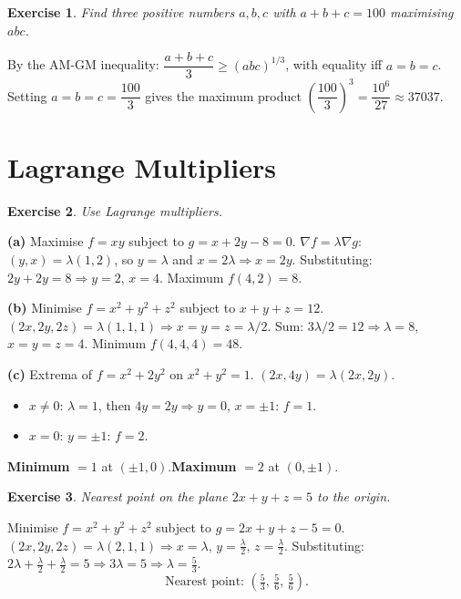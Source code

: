 \documentclass[12pt,a4paper]{article}
\theoremstyle{exstyle}
\newtheorem{exercise}{Exercise}[section]
\newcommand{\grad}{\nabla}
\begin{document}
\begin{exercise}
Find three positive numbers $a,b,c$ with $a+b+c=100$ maximising $abc$.
\end{exercise}
\begin{solbox}
By the AM-GM inequality: $\dfrac{a+b+c}{3}\ge(abc)^{1/3}$, with equality iff $a=b=c$.
Setting $a=b=c=\dfrac{100}{3}$ gives the maximum product
$\left(\dfrac{100}{3}\right)^3=\dfrac{10^6}{27}\approx37037$.
\end{solbox}

\section{Lagrange Multipliers}

\begin{exercise}
Use Lagrange multipliers.
\end{exercise}
\begin{solbox}
\textbf{(a)} Maximise $f=xy$ subject to $g=x+2y-8=0$.
$\grad f=\lambda\grad g$: $(y,x)=\lambda(1,2)$, so $y=\lambda$ and $x=2\lambda\Rightarrow x=2y$.
Substituting: $2y+2y=8\Rightarrow y=2,\,x=4$. Maximum $f(4,2)=8$.

\textbf{(b)} Minimise $f=x^2+y^2+z^2$ subject to $x+y+z=12$.
$(2x,2y,2z)=\lambda(1,1,1)\Rightarrow x=y=z=\lambda/2$. Sum: $3\lambda/2=12\Rightarrow\lambda=8$, $x=y=z=4$.
Minimum $f(4,4,4)=48$.

\textbf{(c)} Extrema of $f=x^2+2y^2$ on $x^2+y^2=1$.
$(2x,4y)=\lambda(2x,2y)$.
\begin{itemize}
  \item $x\neq0$: $\lambda=1$, then $4y=2y\Rightarrow y=0$, $x=\pm1$: $f=1$.
  \item $x=0$: $y=\pm1$: $f=2$.
\end{itemize}
\textbf{Minimum} $=1$ at $(\pm1,0)$.\quad\textbf{Maximum} $=2$ at $(0,\pm1)$.
\end{solbox}

\begin{exercise}
Nearest point on the plane $2x+y+z=5$ to the origin.
\end{exercise}
\begin{solbox}
Minimise $f=x^2+y^2+z^2$ subject to $g=2x+y+z-5=0$.
$(2x,2y,2z)=\lambda(2,1,1)\Rightarrow x=\lambda,\,y=\tfrac{\lambda}{2},\,z=\tfrac{\lambda}{2}$.
Substituting: $2\lambda+\tfrac{\lambda}{2}+\tfrac{\lambda}{2}=5\Rightarrow3\lambda=5\Rightarrow\lambda=\tfrac{5}{3}$.
\[
  \text{Nearest point: }\left(\tfrac{5}{3},\,\tfrac{5}{6},\,\tfrac{5}{6}\right).
\]
\end{solbox}
\end{document}
